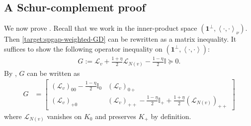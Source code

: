 \documentclass[a4paper,12pt]{article}
\theoremstyle{plain}
\theoremstyle{definition}
\def\*#1{\mathbf{#1}} %
\def\+#1{\mathcal{#1}} %
\def\*#1{\boldsymbol{#1}} %
\def\+#1{\mathcal{#1}} %
\newcommand{\inner}[2]{\left\langle #1,#2\right\rangle}
\begin{document}
\subsection{A Schur-complement proof}
\label{subsec:star-schur-complement-proof}
We now prove .
Recall that we work in the inner-product space $(\*1^\perp, \inner{\cdot}{\cdot}_\nu)$.
Then \eqref{target:spgap-weighted-GD} can be rewritten as a matrix inequality.
It suffices to show the following
operator inequality on $(\*1^\perp,\inner{\cdot}{\cdot})$:
\begin{align*}
  G := \+L_v + \frac{1+\eta}{2}\+L_{N(v)} - \frac{1-\eta}{2} \mathbb{I} \succeq 0.
\end{align*}
By ,
$G$ can be written as
\begin{align*}
  G &= \begin{bmatrix}
    (\+L_v)_{00} - \frac{1-\eta}{2}\mathbb{I}_0 & (\+L_v)_{0+} \\
    (\+L_v)_{+0} & (\+L_v)_{++} - \frac{1-\eta}{2}\mathbb{I}_+ + \frac{1+\eta}{2} (\+L_{N(v)})_{++}
  \end{bmatrix}
\end{align*}
where $\+L_{N(v)}$ vanishes on $K_0$ and preserves $K_+$ by definition.
\end{document}
